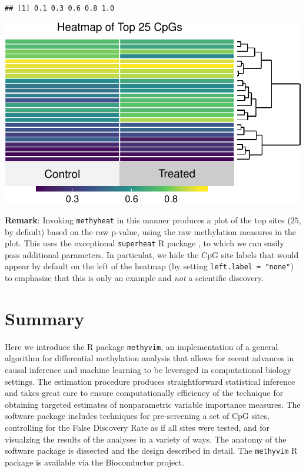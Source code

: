 \documentclass[9pt,a4paper,]{extarticle}
\theoremstyle{definition}
\theoremstyle{definition}
\theoremstyle{definition}
\theoremstyle{remark}
\begin{document}
\begin{verbatim}
## [1] 0.1 0.3 0.6 0.8 1.0
\end{verbatim}

\begin{center}\includegraphics{paper_BiocF1000_files/figure-latex/methyvim-heatmap-1} \end{center}

\textbf{Remark}: Invoking \texttt{methyheat} in this manner produces a plot of the top sites
(\(25\), by default) based on the raw p-value, using the raw methylation measures
in the plot. This uses the exceptional \texttt{superheat} R package
\citep{barter2017superheat}, to which we can easily pass additional parameters. In
particulat, we hide the CpG site labels that would appear by default on the left
of the heatmap (by setting \texttt{left.label\ =\ "none"}) to emphasize that this is only
an example and \emph{not} a scientific discovery.

\hypertarget{summary}{%
\section{Summary}\label{summary}}

Here we introduce the R package \texttt{methyvim}, an implementation of a general
algorithm for differential methylation analysis that allows for recent advances
in causal inference and machine learning to be leveraged in computational
biology settings. The estimation procedure produces straightforward statistical
inference and takes great care to ensure computationally efficiency of the
technique for obtaining targeted estimates of nonparametric variable importance
measures. The software package includes techniques for pre-screening a set of
CpG sites, controlling for the False Discovery Rate as if all sites were tested,
and for visualzing the results of the analyses in a variety of ways. The anatomy
of the software package is dissected and the design described in detail. The
\texttt{methyvim} R package is available via the Bioconductor project.
\end{document}
